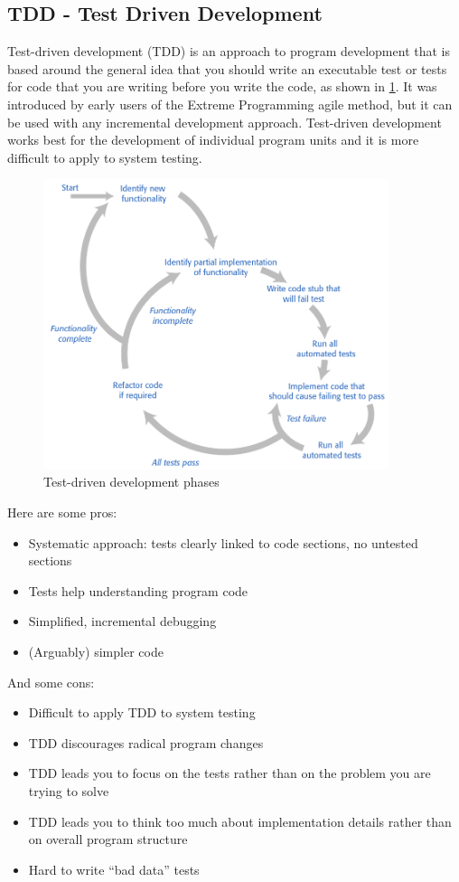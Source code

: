 \documentclass[10pt,a4paper]{report}
\begin{document}
\subsection{TDD - Test Driven Development}
 Test-driven development (TDD) is an approach to program development
that is based around the general idea that you should write an
executable test or tests for code that you are writing before you write the
code, as shown in \ref{image108}. 
It was introduced by early users of the Extreme Programming agile
method, but it can be used with any incremental development approach.
Test-driven development works best for the development of individual
program units and it is more difficult to apply to system testing.
\begin{figure}[h]
	\centering
	\includegraphics[width=0.9\textwidth]{image108}
	\caption{Test-driven development phases}
	\label{image108}
\end{figure} 

Here are some pros:
\begin{itemize}
	\item Systematic approach: tests clearly
	linked to code sections, no
	untested sections
	\item Tests help understanding program
	code
	\item Simplified, incremental debugging
	\item (Arguably) simpler code
\end{itemize}
And some cons:
\begin{itemize}
	\item Difficult to apply TDD to system
	testing
	\item TDD discourages radical program
	changes
	\item TDD leads you to focus on the tests
	rather than on the problem you are
	trying to solve
	\item TDD leads you to think too much
	about implementation details
	rather than on overall program
	structure
	\item Hard to write “bad data” tests
\end{itemize}
\end{document}
